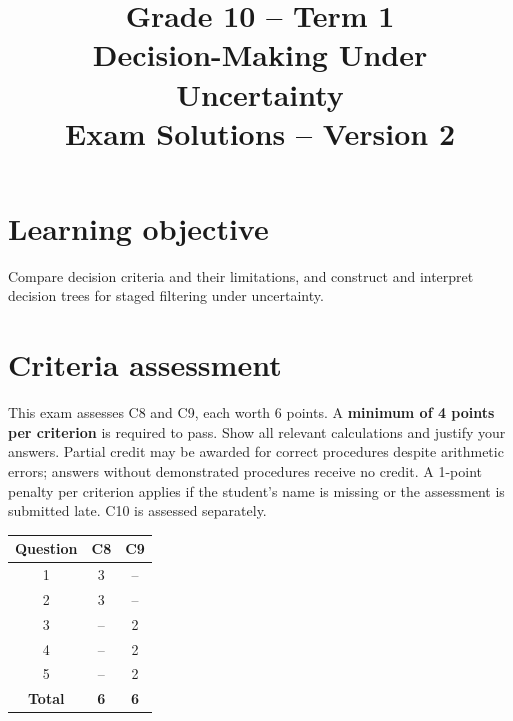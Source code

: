 \makeatletter
{}
\makeatother

\title{Grade 10 -- Term 1\\Decision-Making Under Uncertainty\\Exam Solutions -- Version 2}
\author{}\date{}

\maketitle
\setcounter{tocdepth}{1}\setcounter{secnumdepth}{2}
\label{toc}\tableofcontents
\section*{Learning objective}
Compare decision criteria and their limitations, and construct and interpret decision trees for staged filtering under uncertainty.
\section*{Criteria assessment}
This exam assesses C8 and C9, each worth 6 points. A \textbf{minimum of 4 points per criterion} is required to pass. Show all relevant calculations and justify your answers. Partial credit may be awarded for correct procedures despite arithmetic errors; answers without demonstrated procedures receive no credit. A 1-point penalty per criterion applies if the student's name is missing or the assessment is submitted late. C10 is assessed separately.
\begin{center}
\begin{tabular}{|c|c|c|}
				\hline
				\textbf{Question} & \textbf{C8} & \textbf{C9} \\ \hline
				1 & 3 & -- \\ \hline
				2 & 3 & -- \\ \hline
				3 & -- & 2 \\ \hline
				4 & -- & 2 \\ \hline
				5 & -- & 2 \\ \hline
				\textbf{Total} & \textbf{6} & \textbf{6} \\ \hline
			\end{tabular}
\end{center}
